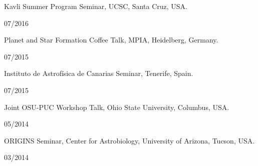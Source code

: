 \documentclass[12pt, a4paper]{article} %
\begin{document}
\begin{minipage}[t]{0.7\textwidth}
\begin{flushleft}%
  \setlength{\leftskip}{0.2cm}%
Kavli Summer Program Seminar, UCSC, Santa Cruz, USA.
\end{flushleft}
\end{minipage}
\begin{minipage}[t]{0.3\textwidth}
\hfill 07/2016
\end{minipage}
\vspace{0.2cm}

\begin{minipage}[t]{0.7\textwidth}
\begin{flushleft}%
  \setlength{\leftskip}{0.2cm}%
Planet and Star Formation Coffee Talk, MPIA,  Heidelberg, Germany.
\end{flushleft}
\end{minipage}
\begin{minipage}[t]{0.3\textwidth}
\hfill 07/2015
\end{minipage}
\vspace{0.2cm}

\begin{minipage}[t]{0.7\textwidth}
\begin{flushleft}%
  \setlength{\leftskip}{0.2cm}%
Instituto de Astrof\'isica de Canarias Seminar, Tenerife, Spain.
\end{flushleft}
\end{minipage}
\begin{minipage}[t]{0.3\textwidth}
\hfill 07/2015
\end{minipage}
\vspace{0.2cm}

\begin{minipage}[t]{0.7\textwidth}
\begin{flushleft}%
  \setlength{\leftskip}{0.2cm}%
Joint OSU-PUC Workshop Talk, Ohio State University, Columbus, USA.
\end{flushleft}
\end{minipage}
\begin{minipage}[t]{0.3\textwidth}
\hfill 05/2014
\end{minipage}
\vspace{0.2cm}

\begin{minipage}[t]{0.7\textwidth}
\begin{flushleft}%
  \setlength{\leftskip}{0.2cm}%
ORIGINS Seminar, Center for Astrobiology, University of Arizona, Tucson, USA.
\end{flushleft}
\end{minipage}
\begin{minipage}[t]{0.3\textwidth}
\hfill 03/2014
\end{minipage}
\vspace{0.2cm}
\end{document}
